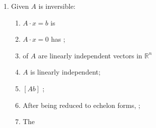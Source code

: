 \begin{enumerate}
    \item Given $ A $ is inversible:
    \begin{enumerate}
      \item $ A \cdot x = b $ is 
      
      \item $ A \cdot x = 0 $ has ;
      
      \item {} of $ A $ are 
      linearly independent vectors in $ \mathbb{R}^{n} $
      
      \item $ A $ is linearly independent;
      
      \item $ \left[ A b \right] $ ;
      
      \item After being reduced to echelon forms, 
      ;
      
      \item The 
    \end{enumerate}
  \end{enumerate}
